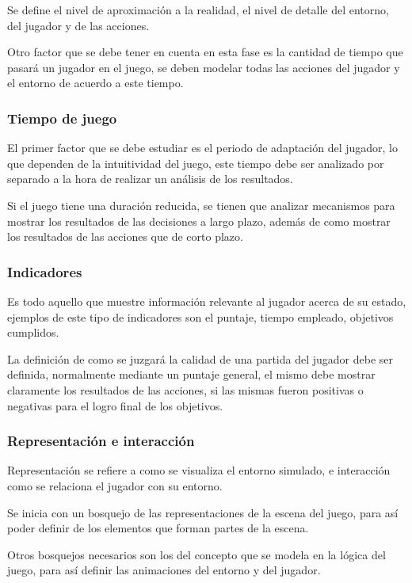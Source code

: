 Se define el nivel de aproximación a la realidad, el nivel de detalle del
entorno, del jugador y de las acciones.

Otro factor que se debe tener en cuenta en esta fase es la cantidad de tiempo
que pasará un jugador en el juego, se deben modelar todas las acciones del
jugador y el entorno de acuerdo a este tiempo.

\subsubsection{Tiempo de juego}

El primer factor que se debe estudiar es el periodo de adaptación del jugador,
lo que dependen de la intuitividad del juego, este tiempo debe ser analizado por
separado a la hora de realizar un análisis de los resultados.

Si el juego tiene una duración reducida, se tienen que analizar mecanismos para
mostrar los resultados de las decisiones a largo plazo, además de como mostrar
los resultados de las acciones que de corto plazo.

\subsubsection{Indicadores}

Es todo aquello que muestre información relevante al jugador acerca de su
estado, ejemplos de este tipo de indicadores son el puntaje, tiempo empleado,
objetivos cumplidos. 

La definición de como se juzgará la calidad de una partida del jugador debe ser
definida, normalmente mediante un puntaje general, el mismo debe mostrar
claramente los resultados de las acciones, si las mismas fueron positivas o
negativas para el logro final de los objetivos.

\subsubsection{Representación e interacción}

Representación se refiere a como se visualiza el entorno simulado, e interacción
como se relaciona el jugador con su entorno.

Se inicia con un bosquejo de las representaciones de la escena del juego, para
así poder definir de los elementos que forman partes de la escena.

Otros bosquejos necesarios son los del concepto que se modela en la lógica del
juego, para así definir las animaciones del entorno y del jugador.

